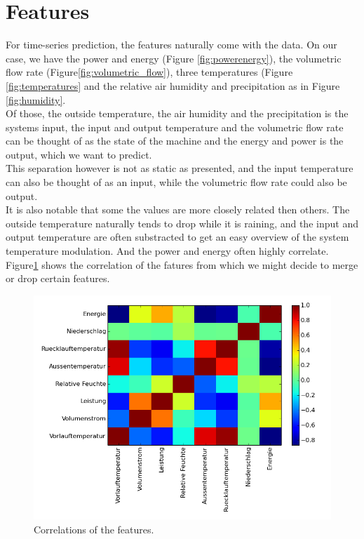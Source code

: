 \documentclass{scrartcl}
\begin{document}
\section{Features}
For time-series prediction, the features naturally come with the data. On our case, we have the power and energy (Figure \ref{fig:powerenergy}), the volumetric flow rate (Figure\ref{fig:volumetric_flow}), three temperatures (Figure \ref{fig:temperatures} and the relative air humidity and precipitation as in Figure \ref{fig:humidity}.\\
Of those, the outside temperature, the air humidity and the precipitation is the systems input, the input and output temperature and the volumetric flow rate can be thought of as the state of the machine and the energy and power is the output, which we want to predict.\\
This separation however is not as static as presented, and the input temperature can also be thought of as an input, while the volumetric flow rate could also be output.\\
It is also notable that some the values are more closely related then others. The outside temperature naturally tends to drop while it is raining, and the input and output temperature are often substracted to get an easy overview of the system temperature modulation. And the power and energy often highly correlate. Figure\ref{fig:correlate} shows the correlation of the fatures from which we might decide to merge or drop certain features.

\begin{figure}[H]
  \centering
  \includegraphics[width=0.5\linewidth]{img/corrmatrix.png}
  \caption{Correlations of the features.}
  \label{fig:correlate}
\end{figure}
\end{document}
